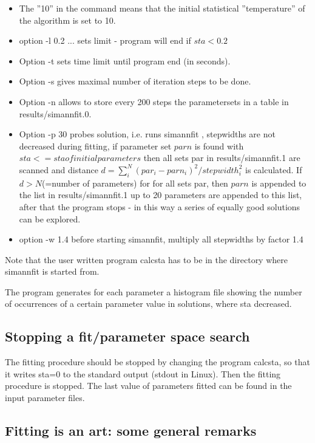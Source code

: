 \begin{itemize}
\item
The ''10'' in the command means that the initial statistical
''temperature'' of the algorithm
is set to 10.  
\item option -l 0.2 ... sets limit - program will end if $sta<0.2$
\item Option -t sets time limit until program end (in seconds).
\item Option -s gives maximal number of iteration steps to be done.
\item Option -n allows to store every 200 steps the parametersets in a table in  {\prg results/simannfit.0}.
\item Option -p 30 probes solution, i.e. runs simannfit , stepwidths are not decreased during
                   fitting, if parameter set $parn$ is found with $sta<=sta of initial parameters$
                   then all sets par in {\prg results/simannfit.1} are scanned and
                   distance $d=\sum_i^N (par_i-parn_i)^2/stepwidth_i^2$ is calculated. If 
                   $d>N $(=number of parameters) for
                   for all sets par, then $parn$ is appended to the list in {\prg results/simannfit.1}
                   up to 20 parameters are appended to this list, after that the program stops
                   - in this way a series of equally good solutions can be explored.
\item option -w 1.4     before starting simannfit, multiply all stepwidths by factor 1.4
\end{itemize}
Note that the user written program {\prg calcsta} has to be in the
directory where {\prg simannfit} is started from.

The program generates for each parameter a histogram file showing the number of occurrences
of a certain parameter value in solutions, where sta decreased.

\subsection{Stopping a fit/parameter space search}

The fitting procedure should be stopped by changing the program {\prg calcsta}, so that it
writes {\prg sta=0} to the standard output (stdout in Linux). Then the fitting
procedure is stopped. The last value of parameters fitted can be found in the
input parameter files.

\subsection{Fitting is an art: some general remarks}

